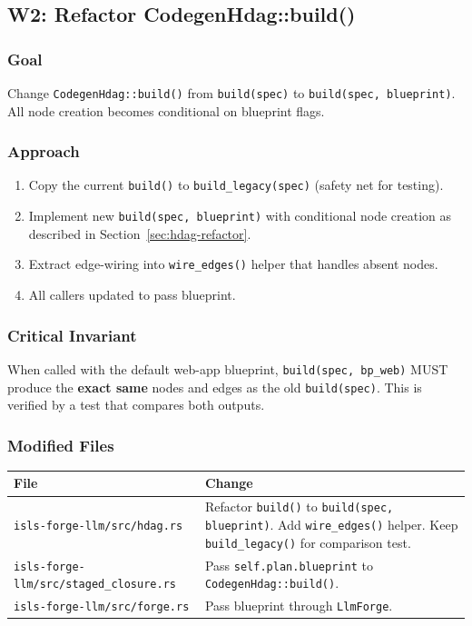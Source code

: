 \documentclass[11pt,a4paper]{article}
\begin{document}
\subsection{W2: Refactor CodegenHdag::build()}
\label{sec:w2}

\subsubsection{Goal}

Change \texttt{CodegenHdag::build()} from \texttt{build(spec)} to 
\texttt{build(spec, blueprint)}. All node creation becomes conditional 
on blueprint flags.

\subsubsection{Approach}

\begin{enumerate}[nosep]
\item Copy the current \texttt{build()} to 
      \texttt{build\_legacy(spec)} (safety net for testing).
\item Implement new \texttt{build(spec, blueprint)} with conditional
      node creation as described in Section~\ref{sec:hdag-refactor}.
\item Extract edge-wiring into \texttt{wire\_edges()} helper that 
      handles absent nodes.
\item All callers updated to pass blueprint.
\end{enumerate}

\subsubsection{Critical Invariant}

When called with the default web-app blueprint, 
\texttt{build(spec, bp\_web)} MUST produce the \textbf{exact same}
nodes and edges as the old \texttt{build(spec)}. 
This is verified by a test that compares both outputs.

\subsubsection{Modified Files}

\begin{longtable}{lp{10cm}}
\toprule
\textbf{File} & \textbf{Change} \\
\midrule
\texttt{isls-forge-llm/src/hdag.rs}
  & Refactor \texttt{build()} to \texttt{build(spec, blueprint)}.
    Add \texttt{wire\_edges()} helper. Keep 
    \texttt{build\_legacy()} for comparison test. \\
\texttt{isls-forge-llm/src/staged\_closure.rs}
  & Pass \texttt{self.plan.blueprint} to \texttt{CodegenHdag::build()}.\\
\texttt{isls-forge-llm/src/forge.rs}
  & Pass blueprint through \texttt{LlmForge}. \\
\bottomrule
\end{longtable}
\end{document}
